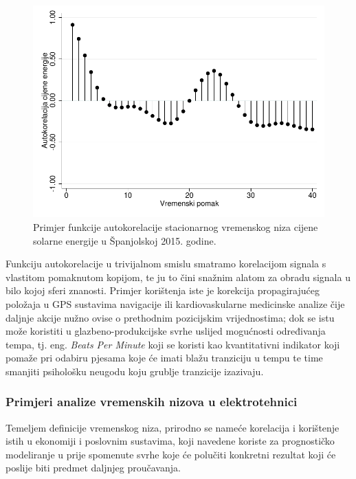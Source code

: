\documentclass[a4paper,12pt,oneside]{memoir}
\begin{document}
            \begin{figure}[H]
                \centering
                \includegraphics[width=.75\linewidth]{graphs/price_autocorrelations.pdf}
                \caption{Primjer funkcije autokorelacije stacionarnog vremenskog niza cijene solarne energije u Španjolskoj 2015. godine.}
            \end{figure}

            Funkciju autokorelacije u trivijalnom smislu smatramo korelacijom signala s vlastitom pomaknutom kopijom, te ju to čini snažnim alatom za obradu signala u bilo kojoj sferi znanosti. Primjer korištenja iste je korekcija propagirajućeg položaja u GPS sustavima navigacije ili kardiovaskularne medicinske analize čije daljnje akcije nužno ovise o prethodnim pozicijskim vrijednostima; dok se istu može koristiti u glazbeno-produkcijske svrhe uslijed mogućnosti određivanja tempa, tj. eng. \textit{Beats Per Minute} koji se koristi kao kvantitativni indikator koji pomaže pri odabiru pjesama koje će imati blažu tranziciju u tempu te time smanjiti psihološku neugodu koju grublje tranzicije izazivaju.

            \subsubsection{Primjeri analize vremenskih nizova u elektrotehnici}
                Temeljem definicije vremenskog niza, prirodno se nameće korelacija i korištenje istih u ekonomiji i poslovnim sustavima, koji navedene koriste za prognostičko modeliranje u prije spomenute svrhe koje će polučiti konkretni rezultat koji će poslije biti predmet daljnjeg proučavanja.
\end{document}
